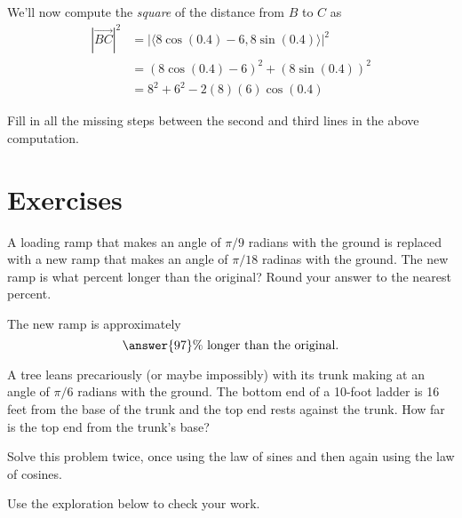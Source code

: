 \documentclass{ximera}
\begin{document}
\begin{example}
\begin{explanation}
We'll now compute the \emph{square} of the distance from $B$ to $C$ as
\begin{align*}
         |  \overrightarrow{BC} |^2 &= |    \langle 8 \cos (0.4) - 6, 8 \sin(0.4)  \rangle    |^2  \\
                                             &= (8 \cos (0.4) - 6)^2 + (8 \sin(0.4))^2   \\
                                             &=  8^2 + 6^2 - 2(8)(6) \cos(0.4)
\end{align*}

\begin{question}  \label{Q4r345fg}
Fill in all the missing steps between the second and third lines in the above computation. 
\end{question}

\end{explanation}

\end{example}




\section{Exercises}

\begin{question} \label{Q0:SineCosine}
A loading ramp that makes an angle of $\pi/9$ radians with the ground is replaced with a new ramp that makes an angle of $\pi/18$ radinas with the ground. The new ramp is what percent longer than the original? Round your answer to the nearest percent.

The new ramp is approximately 
\[
   \answer{97}\% \text{ longer than the original.}
\]


\end{question}


\begin{question} \label{Q00:SineCosine}
A tree leans precariously (or maybe impossibly) with its trunk making at an angle of $\pi/6$ radians with the ground. The bottom end of a 10-foot ladder is 16 feet from the base of the trunk and the top end rests against the trunk. How far is the top end from the trunk's base? 

Solve this problem twice, once using the law of sines and then again using the law of cosines.

Use the exploration below to check your work.

\begin{exploration}

 
\begin{onlineOnly}
    \begin{center}
\end{center}
\end{onlineOnly}
\end{exploration} 

\end{question}
\end{document}
